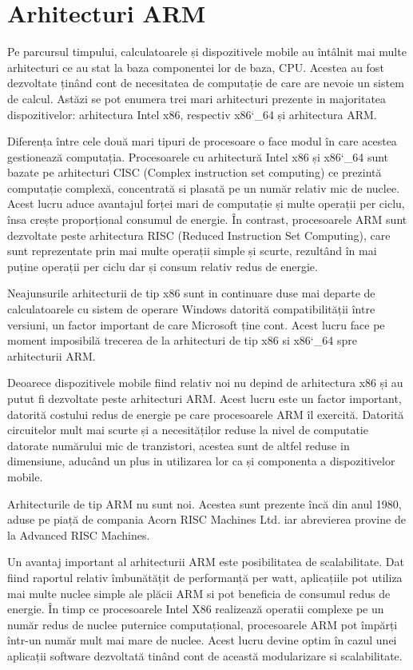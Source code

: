 	\section{Arhitecturi ARM}
	Pe parcursul timpului, calculatoarele și dispozitivele mobile au întâlnit mai multe arhitecturi ce au stat la baza componentei lor de baza, CPU. Acestea au fost dezvoltate ținând cont de necesitatea de computație de care are nevoie un sistem de calcul. Astăzi se pot enumera trei mari arhitecturi prezente in majoritatea dispozitivelor: arhitectura Intel x86, respectiv x86\char`_64 și arhitectura ARM. 
	
	Diferența între cele două mari tipuri de procesoare o face modul în care acestea gestionează computația. Procesoarele cu arhitectură Intel x86 și x86\char`_64 sunt bazate pe arhitecturi CISC (Complex instruction set computing) ce prezintă computație complexă, concentrată si plasată pe un număr relativ mic de nuclee. Acest lucru aduce avantajul forței mari de computație și multe operații per ciclu, însa crește proporțional consumul de energie. În contrast, procesoarele ARM sunt dezvoltate peste arhitectura RISC (Reduced Instruction Set Computing), care sunt reprezentate prin mai multe operații simple și scurte, rezultând în mai puține operații per ciclu dar și consum relativ redus de energie. 
	
	Neajunsurile arhitecturii de tip x86 sunt in continuare duse mai departe de calculatoarele cu sistem de operare Windows datorită compatibilității între versiuni, un factor important de care Microsoft ține cont. Acest lucru face pe moment imposibilă trecerea de la arhitecturi de tip x86 si x86\char`_64 spre arhitecturii ARM. 
	
	Deoarece dispozitivele mobile fiind relativ noi nu depind de arhitectura x86 și au putut fi dezvoltate peste arhitecturi ARM. Acest lucru este un factor important, datorită costului redus de energie pe care procesoarele ARM îl exercită. Datorită circuitelor mult mai scurte și a necesităților reduse la nivel de computatie datorate numărului mic de tranzistori, acestea sunt de altfel reduse in dimensiune, aducând un plus in utilizarea lor ca și componenta a dispozitivelor mobile.
	
	Arhitecturile de tip ARM nu sunt noi. Acestea sunt prezente încă din anul 1980, aduse pe piață de compania Acorn RISC Machines Ltd. iar abrevierea provine de la Advanced RISC Machines. 
	
	Un avantaj important al arhitecturii ARM este posibilitatea de scalabilitate. Dat fiind raportul relativ îmbunătățit de performanță per watt, aplicațiile pot utiliza mai multe nuclee simple ale plăcii ARM si pot beneficia de consumul redus de energie. În timp ce procesoarele 
	Intel X86 realizează operatii complexe pe un număr redus de nuclee puternice computațional, procesoarele ARM pot împărți într-un număr mult mai mare de nuclee. Acest lucru devine optim în cazul unei aplicații software dezvoltată tinând cont de această modularizare si scalabilitate.
	\cite{arm_architecture_android}
	
